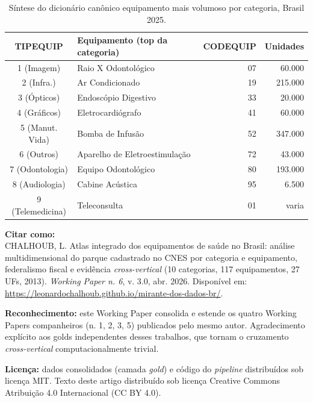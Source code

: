 \documentclass[12pt,a4paper,oneside]{article}
\begin{document}
\begin{table}[H]
\centering
\caption{Síntese do dicionário canônico \textemdash{} equipamento
mais volumoso por categoria, Brasil 2025.}
\label{tab:dict-summary}
\small
\begin{tabular}{clrr}
\toprule
\textbf{TIPEQUIP} & \textbf{Equipamento (top da categoria)} & \textbf{CODEQUIP} & \textbf{Unidades} \\
\midrule
1 (Imagem)         & Raio X Odontológico           & 07 &  60.000 \\
2 (Infra.)         & Ar Condicionado                & 19 & 215.000 \\
3 (Ópticos)        & Endoscópio Digestivo           & 33 &  20.000 \\
4 (Gráficos)       & Eletrocardiógrafo              & 41 &  60.000 \\
5 (Manut. Vida)    & Bomba de Infusão               & 52 & 347.000 \\
6 (Outros)         & Aparelho de Eletroestimulação  & 72 &  43.000 \\
7 (Odontologia)    & Equipo Odontológico            & 80 & 193.000 \\
8 (Audiologia)     & Cabine Acústica                & 95 &   6.500 \\
9 (Telemedicina)   & Teleconsulta                   & 01 &  varia \\
\bottomrule
\end{tabular}
\par{}
\end{table}

\vspace{1cm}

\noindent\textbf{Citar como:}\\
CHALHOUB, L. Atlas integrado dos equipamentos de saúde no Brasil:
análise multidimensional do parque cadastrado no CNES por
categoria e equipamento, federalismo fiscal e evidência
\textit{cross-vertical} (10 categorias, 117 equipamentos, 27 UFs,
2013).
\textit{Working Paper n. 6}, v. 3.0, abr. 2026.
Disponível em:
\url{https://leonardochalhoub.github.io/mirante-dos-dados-br/}.

\vspace{0.5cm}

\noindent\textbf{Reconhecimento:} este Working Paper consolida e
estende os quatro Working Papers companheiros (n. 1, 2, 3, 5)
publicados pelo mesmo autor. Agradecimento explícito aos golds
independentes desses trabalhos, que tornam o cruzamento
\textit{cross-vertical} computacionalmente trivial.

\vspace{0.5cm}

\noindent\textbf{Licença:} dados consolidados (camada \textit{gold})
e código do \textit{pipeline} distribuídos sob licença MIT. Texto
deste artigo distribuído sob licença Creative Commons Atribuição
4.0 Internacional (CC BY 4.0).
\end{document}
